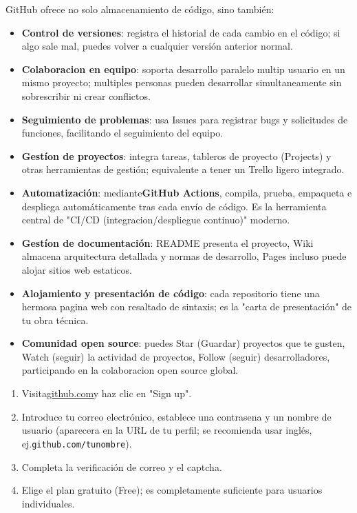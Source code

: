 
GitHub ofrece no solo almacenamiento de código, sino también:

\begin{itemize}
  \item \textbf{Control de versiones}: registra el historial de cada cambio en el código; si algo sale mal, puedes volver a cualquier versión anterior normal.
  \item \textbf{Colaboracion en equipo}: soporta desarrollo paralelo multip usuario en un mismo proyecto; multiples personas pueden desarrollar simultaneamente sin sobrescribir ni crear conflictos.
  \item \textbf{Seguimiento de problemas}: usa Issues para registrar bugs y solicitudes de funciones, facilitando el seguimiento del equipo.
  \item \textbf{Gestíon de proyectos}: integra tareas, tableros de proyecto (Projects) y otras herramientas de gestión; equivalente a tener un Trello ligero integrado.
  \item \textbf{Automatización}: mediante\textbf{GitHub Actions}, compila, prueba, empaqueta e despliega automáticamente tras cada envío de código. Es la herramienta central de "CI/CD (integracion/despliegue continuo)" moderno.
  \item \textbf{Gestíon de documentación}: README presenta el proyecto, Wiki almacena arquitectura detallada y normas de desarrollo, Pages incluso puede alojar sitios web estaticos.
  \item \textbf{Alojamiento y presentación de código}: cada repositorio tiene una hermosa pagina web con resaltado de sintaxis; es la "carta de presentación" de tu obra técnica.
  \item \textbf{Comunidad open source}: puedes Star (Guardar) proyectos que te gusten, Watch (seguir) la actividad de proyectos, Follow (seguir) desarrolladores, participando en la colaboracion open source global.
\end{itemize}



\begin{enumerate}
  \item Visita\href{https://github.com}{github.com}y haz clic en "Sign up".
  \item Introduce tu correo electrónico, establece una contrasena y un nombre de usuario (aparecera en la URL de tu perfil; se recomienda usar inglés, ej.\texttt{github.\allowbreak com/\allowbreak tunombre}).
  \item Completa la verificación de correo y el captcha.
  \item Elige el plan gratuito (Free); es completamente suficiente para usuarios individuales.
\end{enumerate}

